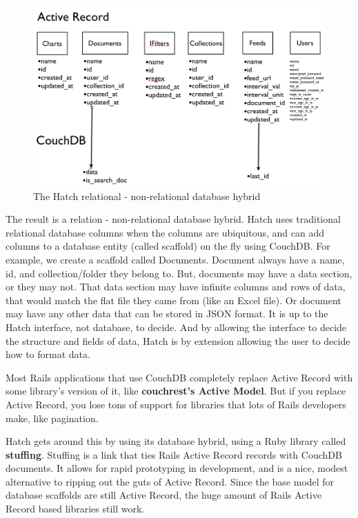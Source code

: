 \begin{figure}[h]
	\begin{center}
	\includegraphics[width=120mm]{images/hatch_db_hybrid}
	\caption{The Hatch relational - non-relational database hybrid} 
	\label{hatch_db_hybrid}
	\end{center}
\end{figure}

The result is a relation - non-relational database hybrid. Hatch uses traditional 
relational database columns when the columns are ubiquitous, and can add columns to
a database entity (called scaffold) on the fly using CouchDB. For example, we create
a scaffold called Documents. Document always have a name, id, and collection/folder
they belong to. But, documents may have a data section, or they may not. That
data section may have infinite columns and rows of data, that would match the flat 
file they came from (like an Excel file). Or document may have any other data that
can be stored in JSON format. It is up to the Hatch interface, not database, to 
decide. And by allowing the interface to decide the structure and fields of data, Hatch
is by extension allowing the user to decide how to format data.

Most Rails applications that use CouchDB completely replace Active Record with some
library's version of it, like \textbf{couchrest's Active Model}. But if you replace
Active Record, you lose tons of support for libraries that lots of Rails developers
make, like pagination. 

Hatch gets around this by using its database hybrid, using a Ruby library called
\textbf{stuffing}. Stuffing is a link that ties Rails Active Record records with
CouchDB documents. It allows for rapid prototyping in development, and is a nice, modest
alternative to ripping out the guts of Active Record. Since the base model for 
database scaffolds are still Active Record, the huge amount of Rails Active Record based
libraries still work.

